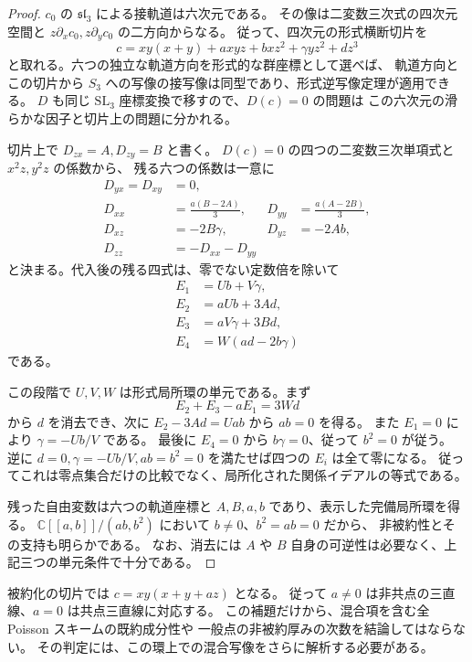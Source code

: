 \begin{proof}
$c_0$ の $\mathfrak{sl}_3$ による接軌道は六次元である。
その像は二変数三次式の四次元空間と
$z\partial_xc_0,z\partial_yc_0$ の二方向からなる。
従って、四次元の形式横断切片を
\[
 c=xy(x+y)+a xyz+b xz^2+\gamma yz^2+d z^3
\]
と取れる。六つの独立な軌道方向を形式的な群座標として選べば、
軌道方向とこの切片から $S_3$ への写像の接写像は同型であり、形式逆写像定理が適用できる。
$D$ も同じ $\mathrm{SL}_3$ 座標変換で移すので、$D(c)=0$ の問題は
この六次元の滑らかな因子と切片上の問題に分かれる。

切片上で $D_{zx}=A,D_{zy}=B$ と書く。
$D(c)=0$ の四つの二変数三次単項式と $x^2z,y^2z$ の係数から、
残る六つの係数は一意に
\[
\begin{aligned}
 D_{yx}=D_{xy}&=0,\\
 D_{xx}&=\frac{a(B-2A)}3,&
 D_{yy}&=\frac{a(A-2B)}3,\\
 D_{xz}&=-2B\gamma,&D_{yz}&=-2Ab,\\
 D_{zz}&=-D_{xx}-D_{yy}
\end{aligned}
\]
と決まる。代入後の残る四式は、零でない定数倍を除いて
\[
\begin{aligned}
 E_1&=Ub+V\gamma,\\
 E_2&=aUb+3Ad,\\
 E_3&=aV\gamma+3Bd,\\
 E_4&=W(ad-2b\gamma)
\end{aligned}
\]
である。

この段階で $U,V,W$ は形式局所環の単元である。まず
\[
 E_2+E_3-aE_1=3Wd
\]
から $d$ を消去でき、次に $E_2-3Ad=Uab$ から $ab=0$ を得る。
また $E_1=0$ により $\gamma=-Ub/V$ である。
最後に $E_4=0$ から $b\gamma=0$、従って $b^2=0$ が従う。
逆に $d=0,\gamma=-Ub/V,ab=b^2=0$ を満たせば四つの $E_i$ は全て零になる。
従ってこれは零点集合だけの比較でなく、局所化された関係イデアルの等式である。

残った自由変数は六つの軌道座標と $A,B,a,b$ であり、表示した完備局所環を得る。
$\mathbb C[[a,b]]/(ab,b^2)$ において $b\ne0$、$b^2=ab=0$ だから、
非被約性とその支持も明らかである。
なお、消去には $A$ や $B$ 自身の可逆性は必要なく、上記三つの単元条件で十分である。
\end{proof}

被約化の切片では $c=xy(x+y+az)$ となる。
従って $a\ne0$ は非共点の三直線、$a=0$ は共点三直線に対応する。
この補題だけから、混合項を含む全 Poisson スキームの既約成分性や
一般点の非被約厚みの次数を結論してはならない。
その判定には、この環上での混合写像をさらに解析する必要がある。
